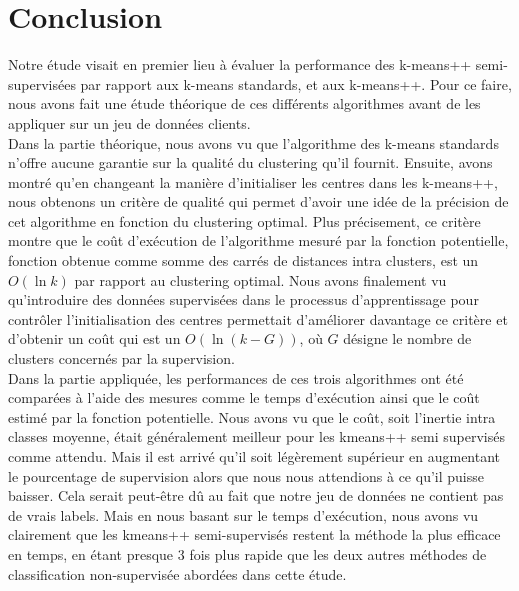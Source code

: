 \documentclass[12pt,a4paper]{book}
\newcommand{\1}{\mathds{1}}
\begin{document}
\vspace{10 mm}

\section{Conclusion}


\vspace{10 mm}

\noindent
Notre étude visait en premier lieu à évaluer la performance des k-means++ semi-supervisées par rapport aux k-means standards, et aux k-means++. Pour ce faire, nous avons fait une étude théorique de ces différents algorithmes avant de les appliquer sur un jeu de données clients.\\

\noindent
Dans la partie théorique, nous avons vu que l'algorithme des k-means standards n'offre aucune garantie sur la qualité du clustering qu'il fournit. Ensuite, avons montré qu'en changeant la manière d'initialiser les centres dans les k-means++, nous obtenons un critère de qualité qui permet d'avoir une idée de la précision de cet algorithme en fonction du clustering optimal. Plus précisement, ce critère montre que le coût d'exécution de l'algorithme mesuré par la fonction potentielle, fonction obtenue comme somme des carrés de distances intra clusters, est un $O(\ln k)$ par rapport au clustering optimal.  Nous avons finalement vu qu'introduire des données supervisées dans le processus d'apprentissage pour contrôler l'initialisation des centres permettait d'améliorer davantage ce critère et d'obtenir un coût qui est un $O(\ln(k-G))$, où $G$ désigne le nombre de clusters concernés par la supervision.\\

\noindent
Dans la partie appliquée, les performances de ces trois algorithmes ont été comparées à l'aide des mesures comme le temps d'exécution ainsi que le coût estimé par la fonction potentielle. Nous avons vu que le coût, soit l'inertie intra classes moyenne, était généralement meilleur pour les kmeans++ semi supervisés comme attendu. Mais il est arrivé qu'il soit légèrement supérieur en augmentant le pourcentage de supervision alors que nous nous attendions à ce qu'il puisse baisser. Cela serait peut-être dû au fait que notre jeu de données ne contient pas de vrais labels. Mais en nous basant sur le temps d'exécution, nous avons vu clairement que les kmeans++ semi-supervisés restent la méthode la plus efficace en temps, en étant presque 3 fois plus rapide que les deux autres méthodes de classification non-supervisée abordées dans cette étude.\\
\end{document}
